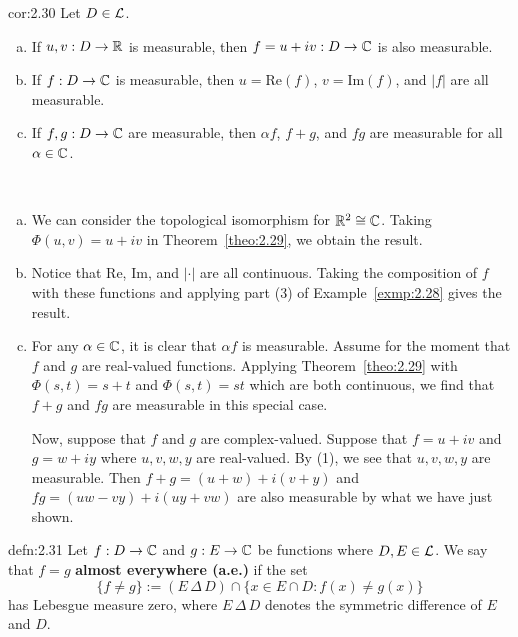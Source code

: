 \begin{cor}{cor:2.30}
    Let $D \in {\cal L}$. 
    \begin{enumerate}[(a)]
        \item If $u, v : D \to \mathbb{R}$ is measurable, then 
        $f = u+iv : D \to \mathbb{C}$ is also measurable. 
        \item If $f : D \to \mathbb{C}$ is measurable, then $u = \text{Re}(f)$,
        $v = \text{Im}(f)$, and $|f|$ are all measurable. 
        \item If $f, g : D \to \mathbb{C}$ are measurable, then $\alpha f$, 
        $f + g$, and $fg$ are measurable for all $\alpha \in \mathbb{C}$. 
    \end{enumerate}
\end{cor}
\begin{pf}~
    \begin{enumerate}[(a)]
        \item We can consider the topological isomorphism for $\mathbb{R}^2 \cong \mathbb{C}$. 
        Taking $\Phi(u, v) = u + iv$ in Theorem~\ref{theo:2.29}, we obtain the 
        result. 
        \item Notice that $\text{Re}$, $\text{Im}$, and $|\cdot|$ are all 
        continuous. Taking the composition of $f$ with these functions and 
        applying part (3) of Example~\ref{exmp:2.28} gives the result. 
        \item For any $\alpha \in \mathbb{C}$, it is clear that $\alpha f$ is 
        measurable. Assume for the moment that $f$ and $g$ are real-valued 
        functions. Applying Theorem~\ref{theo:2.29} with $\Phi(s, t) 
        = s + t$ and $\Phi(s, t) = st$ which are both continuous, we 
        find that $f + g$ and $fg$ are measurable in this special case. 

        Now, suppose that $f$ and $g$ are complex-valued. Suppose that 
        $f = u + iv$ and $g = w + iy$ where $u, v, w, y$ are real-valued. 
        By (1), we see that $u, v, w, y$ are measurable. Then 
        $f + g = (u + w) + i(v + y)$ and $fg = (uw - vy) + i(uy + vw)$ 
        are also measurable by what we have just shown. \qedhere 
    \end{enumerate}
\end{pf}

\begin{defn}{defn:2.31}
    Let $f : D \to \mathbb{C}$ and $g : E \to \mathbb{C}$ be functions where $D, E \in {\cal L}$. 
    We say that $f = g$ {\bf almost everywhere (a.e.)} if the set 
    \[ \{f \neq g\} := (E\,\Delta\,D) \cap \{x \in E \cap D : f(x) \neq g(x)\} \] 
    has Lebesgue measure zero, where $E\,\Delta\,D$ denotes the symmetric 
    difference of $E$ and $D$. 
\end{defn}

